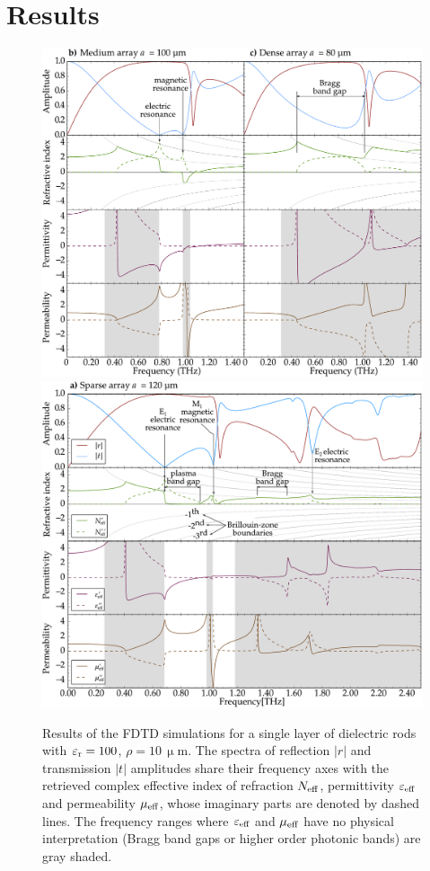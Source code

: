 \section{Results}
\begin{figure} \centering%
\includegraphics[width=115mm]{img/ERods_eps100_double_a100a080_FDTD.pdf}
\includegraphics[width=115mm]{img/ERods_eps100_single_a120_FDTD.pdf}
\caption{Results of the FDTD simulations for a single layer of dielectric rods with $\varepsilon_{\rm r}= 100$, $\rho=10$\,$\upmu$m. The spectra of reflection $|r|$ and transmission $|t|$ amplitudes share their frequency axes with the retrieved complex effective index of refraction $N_{\text{eff} }$, permittivity $\varepsilon_{\text{eff} }$ and permeability $\mu_{\text{eff} }$, whose imaginary parts are denoted by dashed lines. The frequency ranges where $\varepsilon_{\text{eff} }$ and $\mu_{\text{eff} }$ have no physical interpretation (Bragg band gaps or higher order photonic bands) are gray shaded.  } \label{fg_spec}
\end{figure}

